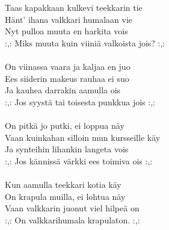
            Taas kapakkaan kulkevi teekkarin tie \\
            Hänt' ihana valkkari humalaan vie \\
            Nyt pulloa muuta en harkita vois \\
            :,: Miks muuta kuin viiniä valkoista jois? :,: \\
\hspace{10mm} \\
            On viinassa vaara ja kaljaa en juo \\
            Ees siiderin makeus rauhaa ei suo \\
            Ja kauhea darrakin aamulla ois \\
            :,: Jos syystä tai toisesta punkkua jois :,: \\
\hspace{10mm} \\
            On pitkä jo putki, ei loppua näy \\
            Vaan kuinkahan silloin mun kursseille käy \\
            Ja synteihin lihankin langeta vois \\
            :,: Jos kännissä värkki ees toimiva ois :,: \\
\hspace{10mm} \\
            Kun aamulla teekkari kotia käy \\
            On krapula muilla, ei lohtua näy \\
            Vaan valkkarin juonut viel hilpeä on \\
            :,: On valkkarihumala krapulaton. :,: \\
